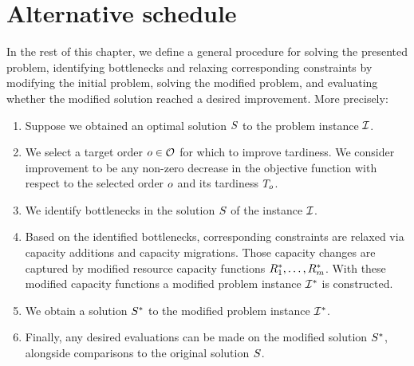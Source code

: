 \section{Alternative schedule} \label{sec:alternative-schedule}

In the rest of this chapter, we define a general procedure for solving the presented problem,
identifying bottlenecks and relaxing corresponding constraints by modifying the initial problem,
solving the modified problem,
and evaluating whether the modified solution reached a desired improvement.
More precisely:

\begin{enumerate}
    \item Suppose we obtained an optimal solution $S$ to the problem instance $\mathcal{I}$.

    \item We select a target order $o \in \mathcal{O}$ for which to improve tardiness.
        We consider improvement to be any non-zero decrease in the objective function with respect to the
        selected order $o$ and its tardiness $T_{o}$.

    \item We identify bottlenecks in the solution $S$ of the instance $\mathcal{I}$.

    \item Based on the identified bottlenecks, corresponding constraints are relaxed via
        capacity additions and capacity migrations.
        Those capacity changes are captured by modified resource capacity functions
        $R_{1}^*, \ldots, R_{m}^*$.
        With these modified capacity functions a modified problem instance $\mathcal{I}^*$ is constructed.

    \item We obtain a solution $S^*$ to the modified problem instance $\mathcal{I}^*$.

    \item Finally, any desired evaluations can be made on the modified solution $S^*$,
        alongside comparisons to the original solution $S$.
\end{enumerate}
